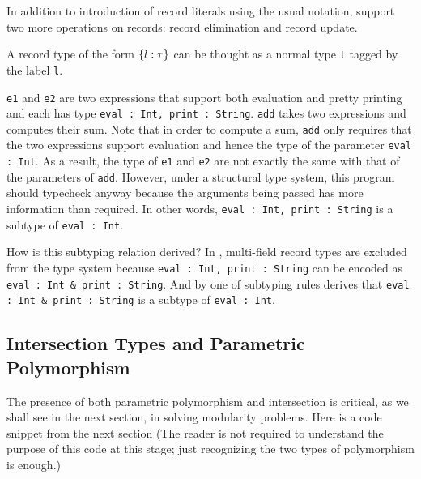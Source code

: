 In addition to introduction of record literals using the usual
notation, \name support two more operations on records: record
elimination and record update.

A record type of the form $ \{ l : \tau \} $ can be thought as a normal type \lstinline{t}
tagged by the label \lstinline{l}.



\lstinline{e1} and \lstinline{e2} are two expressions that support both evaluation and pretty
printing and each has type \lstinline{eval : Int, print : String}. \lstinline{add} takes
two expressions and computes their sum. Note that in order to compute a sum,
\lstinline{add} only requires that the two expressions support evaluation and hence the
type of the parameter \lstinline{eval : Int}. As a result, the type of \lstinline{e1} and
\lstinline{e2} are not exactly the same with that of the parameters of \lstinline{add}. However,
under a structural type system, this program should typecheck anyway because the
arguments being passed has more information than required. In other words,
\lstinline{eval : Int, print : String} is a subtype of \lstinline{eval : Int}.

How is this subtyping relation derived? In \name, multi-field record types are
excluded from the type system because \lstinline{eval : Int, print : String} can
be encoded as \lstinline{eval : Int & print : String}. And by one of
subtyping rules derives that \lstinline{eval : Int & print : String} is a
subtype of \lstinline{eval : Int}.




\subsection{Intersection Types and Parametric Polymorphism}

The presence of both parametric polymorphism and intersection is critical, as we
shall see in the next section, in solving modularity problems. Here is a code
snippet from the next section (The reader is not required to understand the
purpose of this code at this stage; just recognizing the two types of
polymorphism is enough.)

